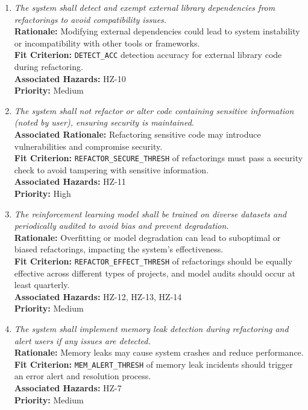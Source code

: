 \documentclass{article}
\begin{document}
\begin{enumerate}[label=SCR \arabic*., wide=0pt, leftmargin=*]
    \item \emph{The system shall detect and exempt external library dependencies from refactorings to avoid compatibility issues.}\\
    {\bf Rationale:} Modifying external dependencies could lead to system instability or incompatibility with other tools or frameworks.\\
    {\bf Fit Criterion:} \texttt{DETECT\_ACC} detection accuracy for external library code during refactoring.\\
    {\bf Associated Hazards:} HZ-10\\
    {\bf Priority:} Medium

    \item \emph{The system shall not refactor or alter code containing sensitive information (noted by user), ensuring security is maintained.}\\
    {\bf Associated Rationale:} Refactoring sensitive code may introduce vulnerabilities and compromise security.\\
    {\bf Fit Criterion:} \texttt{REFACTOR\_SECURE\_THRESH} of refactorings must pass a security check to avoid tampering with sensitive information.\\
    {\bf Associated Hazards:} HZ-11\\
    {\bf Priority:} High

    \item \emph{The reinforcement learning model shall be trained on diverse datasets and periodically audited to avoid bias and prevent degradation.}\\
    {\bf Rationale:} Overfitting or model degradation can lead to suboptimal or biased refactorings, impacting the system's effectiveness.\\
    {\bf Fit Criterion:} \texttt{REFACTOR\_EFFECT\_THRESH} of refactorings should be equally effective across different types of projects, and model audits should occur at least quarterly.\\
    {\bf Associated Hazards:} HZ-12, HZ-13, HZ-14\\
    {\bf Priority:} Medium

    \item \emph{The system shall implement memory leak detection during refactoring and alert users if any issues are detected.}\\
    {\bf Rationale:} Memory leaks may cause system crashes and reduce performance.\\
    {\bf Fit Criterion:} \texttt{MEM\_ALERT\_THRESH} of memory leak incidents should trigger an error alert and resolution process.\\
    {\bf Associated Hazards:} HZ-7\\
    {\bf Priority:} Medium


\end{enumerate}
\end{document}
